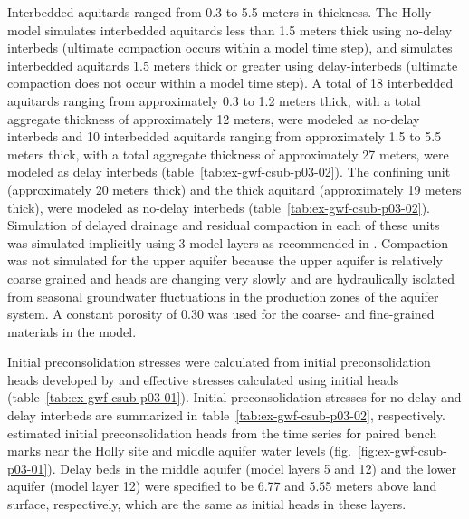 Interbedded aquitards ranged from 0.3 to 5.5 meters in thickness. The Holly model simulates interbedded aquitards less than 1.5 meters thick using no-delay interbeds (ultimate compaction occurs within a model time step), and simulates interbedded aquitards 1.5 meters thick or greater using delay-interbeds (ultimate compaction does not occur within a model time step). A total of 18 interbedded aquitards ranging from approximately 0.3 to 1.2 meters thick, with a total aggregate thickness of approximately 12 meters, were modeled as no-delay interbeds and 10 interbedded aquitards ranging from approximately 1.5 to 5.5 meters thick, with a total aggregate thickness of approximately 27 meters, were modeled as delay interbeds (table~\ref{tab:ex-gwf-csub-p03-02}). The confining unit (approximately 20 meters thick) and the thick aquitard (approximately 19 meters thick), were modeled as no-delay interbeds (table~\ref{tab:ex-gwf-csub-p03-02}). Simulation of delayed drainage and residual compaction in each of these units was simulated implicitly using 3 model layers as recommended in \cite{hoffmann2003modflow}. Compaction was not simulated for the upper aquifer because the upper aquifer is relatively coarse grained and heads are changing very slowly and are hydraulically isolated from seasonal groundwater fluctuations in the production zones of the aquifer system. A constant porosity of 0.30 was used for the coarse- and fine-grained materials in the model.

 

Initial preconsolidation stresses were calculated from initial preconsolidation heads developed by \cite{sneed2008} and effective stresses calculated using initial heads (table~\ref{tab:ex-gwf-csub-p03-01}). Initial preconsolidation stresses for no-delay and delay interbeds are summarized in table~\ref{tab:ex-gwf-csub-p03-02}, respectively. \cite{sneed2008} estimated initial preconsolidation heads from the time series for paired bench marks near the Holly site and middle aquifer water levels (fig.~\ref{fig:ex-gwf-csub-p03-01}). Delay beds in the middle aquifer (model layers 5 and 12) and the lower aquifer (model layer 12) were specified to be 6.77 and 5.55 meters above land surface, respectively, which are the same as initial heads in these layers. 

